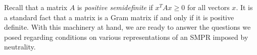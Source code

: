 \documentclass[prodmode,acmec]{ec-acmsmall}
\newcommand{\calL}{{\mathcal{L}}}
\newcommand{\rank}{{\calL(A)}}
\begin{document}
%
Recall that a matrix $A$ is \emph{positive semidefinite} if $x^T A x \geq 0$ for all vectors $x$. It is a standard fact that a matrix is a Gram matrix if and only if it is positive definite. 
With this machinery at hand, we are ready to answer the questions we posed regarding conditions on various representations of an SMPR imposed by neutrality. 
%

\end{document}

